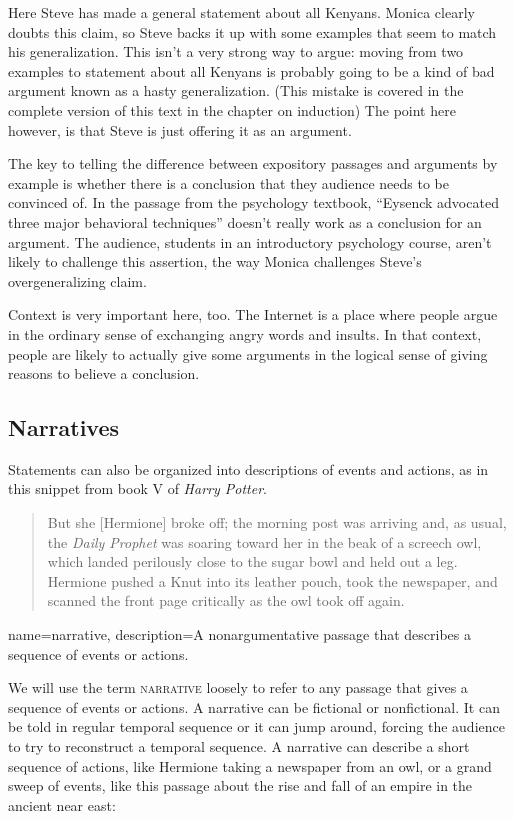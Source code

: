 Here Steve has made a general statement about all Kenyans. Monica clearly doubts this claim, so Steve backs it up with some examples that seem to match his generalization. This isn't a very strong way to argue: moving from two examples to statement about all Kenyans is probably going to be a kind of bad argument known as a hasty generalization. (This mistake is covered in the complete version of this text in the chapter on induction\label{ver_var}) The point here however, is that Steve is just offering it as an argument. 

The key to telling the difference between expository passages and arguments by example is whether there is a conclusion that they audience needs to be convinced of. In the passage from the psychology textbook, ``Eysenck advocated three major behavioral techniques'' doesn't really work as a conclusion for an argument. The audience, students in an introductory psychology course, aren't likely to challenge this assertion, the way Monica  challenges Steve's overgeneralizing claim. 

Context is very important here, too. The Internet is a place where people argue in the ordinary sense of exchanging angry words and insults. In that context, people are likely to actually give some arguments in the logical sense of giving reasons to believe a conclusion. 

\subsection{Narratives} 

Statements can also be organized into descriptions of events and actions, as in this snippet from book V of \textit{Harry Potter}.

\begin{quotation} \noindent But she [Hermione] broke off; the morning post was arriving and, as usual, the \textit{Daily Prophet} was soaring toward her in the beak of a screech owl, which landed perilously close to the sugar bowl and held out a leg. Hermione pushed a Knut into its leather pouch, took the newspaper, and scanned the front page critically as the owl took off again. \citep{Rowling2003} \end{quotation} 

{
name=narrative,
description={A nonargumentative passage that describes a sequence of events or actions.}
}

We will use the term \textsc{\gls{narrative}} \label{def:narrative} loosely to refer to any passage that gives a sequence of events or actions. A narrative can be fictional or nonfictional. It can be told in regular temporal sequence or it can jump around, forcing the audience to try to reconstruct a temporal sequence. A narrative can describe a short sequence of actions, like Hermione taking a newspaper from an owl, or a grand sweep of events, like this passage about the  rise and fall of an empire in the ancient near east:

